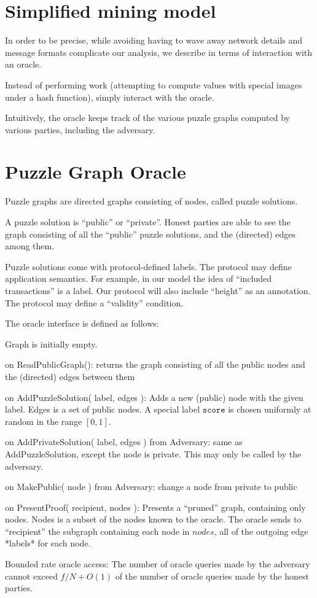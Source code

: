 \section{Simplified mining model}

In order to be precise, while avoiding having to wave away network details and
message formats complicate our analysis, we describe in terms of interaction
with an oracle.

Instead of performing work (attempting to compute values with special images
under a hash function), simply interact with the oracle.

Intuitively, the oracle keeps track of the various puzzle graphs computed by
various parties, including the adversary.

\section{Puzzle Graph Oracle}

Puzzle graphs are directed graphs consisting of nodes, called puzzle solutions.

A puzzle solution is ``public'' or ``private''. Honest parties are able to see
the graph consisting of all the ``public'' puzzle solutions, and the (directed)
edges among them.

Puzzle solutions come with protocol-defined labels. The protocol may define
application semantics. For example, in our model the idea of ``included
transactions'' is a label. Our protocol will also include ``height'' as an
annotation. The protocol may define a ``validity'' condition.

The oracle interface is defined as follows:

    Graph is initially empty.

    on ReadPublicGraph():
        returns the graph consisting of all the public nodes and the (directed) edges between them

    on AddPuzzleSolution( label, edges ):
        Adds a new (public) node with the given label. Edges is a set of public nodes.
        A special label $\texttt{score}$ is chosen uniformly at random in the
        range $[0, 1]$.

    on AddPrivateSolution( label, edges ) from Adversary:
        same as AddPuzzleSolution, except the node is private. This may only be called by the adversary.


    on MakePublic( node ) from Adversary: change a node from private to public


    on PresentProof( recipient, nodes ):
        Presents a “pruned” graph, containing only nodes.
        Nodes is a subset of the nodes known to the oracle.
        The oracle sends to “recipient” the subgraph containing each node in $nodes$, all of the outgoing edge *labels* for each node.

Bounded rate oracle access:
    The number of oracle queries made by the adversary cannot exceed $f/N +
    O(1)$ of the number of oracle queries made by the honest parties.
